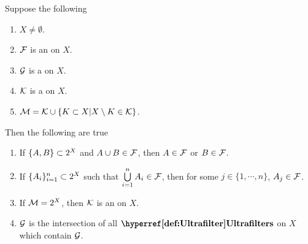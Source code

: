 \begin{prop}
\label{prop:UltrafilterFacts}
    Suppose the following
    \begin{enumerate}[label=(\Roman*), ref={\ref{prop:UltrafilterFacts}.~\Roman*}]
        \item \label{prop:UltrafilterFacts:Ass1} $X \neq \emptyset$. 
        \item \label{prop:UltrafilterFacts:Ass2} $\mathcal{F}$ is an \Ultrafilter on $X$. 
        \item \label{prop:UltrafilterFacts:Ass3} $\mathcal{G}$ is a \Filter on $X$. 
        \item \label{prop:UltrafilterFacts:Ass4} $\mathcal{K}$ is a \FilterSubbasis on $X$. 
        \item \label{prop:UltrafilterFacts:Ass5} 
        $\mathcal{M}=\mathcal{K} \cup \{K \subset X | X \setminus K \in \mathcal{K}\}$. 
    \end{enumerate}

    Then the following are true
    \begin{enumerate}
        \item \label{prop:UltrafilterFacts:BinaryUnion} 
        If $\{A,B\} \subset 2^{X}$ and 
        $A \cup B \in \mathcal{F}$, 
        then  $A \in \mathcal{F}$ or $B \in \mathcal{F}$. 
        \item \label{prop:UltrafilterFacts:FiniteUnion}
        If $\{A_i\}_{i=1}^n \subset 2^{X}$ such that 
        $\bigcup\limits_{i=1}^n A_i \in \mathcal{F}$, 
        then for some $j \in \{1, \cdots, n\}$, 
        $A_j \in \mathcal{F}$. 
        \item \label{prop:UltraFilterFacts:UltrafilterCondition}
        If $\mathcal{M} = 2^{X}$, then $\mathcal{K}$ is an \UltraFilter on $X$. 
        \item \label{prop:UltraFilterFacts:UltrafilterIntersection} 
        $\mathcal{G}$ is the intersection of all $\Ultrafilters$ on $X$ which contain $\mathcal{G}$.
    \end{enumerate}



\end{prop}
